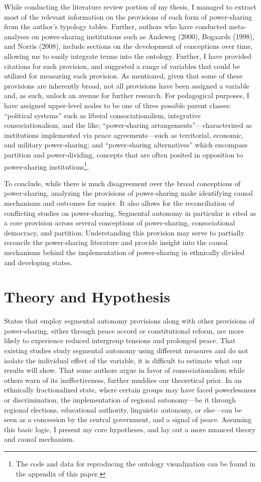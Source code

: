 \documentclass[12pt]{article}
\begin{document}
While conducting the literature review portion of my thesis, I managed to extract most of the relevant information on the provisions of each form of power-sharing from the author’s typology tables. Further, authors who have conducted meta-analyses on power-sharing institutions such as Andeweg (2000), Bogaards (1998), and Norris (2008), include sections on the development of conceptions over time, allowing me to easily integrate terms into the ontology. Further, I have provided citations for each provision, and suggested a range of variables that could be utilized for measuring each provision. As mentioned, given that some of these provisions are inherently broad, not all provisions have been assigned a variable and, as such, unlock an avenue for further research. For pedagogical purposes, I have assigned upper-level nodes to be one of three possible parent classes: ``political systems'' such as liberal consociationalism, integrative consociationalism, and the like; ``power-sharing arrangements''---characterized as institutions implemented via peace agreements---such as territorial, economic, and military power-sharing; and ``power-sharing alternatives'' which encompass partition and power-dividing, concepts that are often posited in opposition to power-sharing institutions\footnote{The code and data for reproducing the ontology visualization can be found in the appendix of this paper.}.

To conclude, while there is much disagreement over the broad conceptions of power-sharing, analyzing the provisions of power-sharing make identifying causal mechanisms and outcomes far easier. It also allows for the reconciliation of conflicting studies on power-sharing. Segmental autonomy in particular is cited as a core provision across several conceptions of power-sharing, consociational democracy, and partition. Understanding this provision may serve to partially reconcile the power-sharing literature and provide insight into the causal mechanisms behind the implementation of power-sharing in ethnically divided and developing states. 

\section{Theory and Hypothesis}
States that employ segmental autonomy provisions along with other provisions of power-sharing, either through peace accord or constitutional reform, are more likely to experience reduced intergroup tensions and prolonged peace. That existing studies study segmental autonomy using different measures and do not isolate the individual effect of the variable, it is difficult to estimate what our results will show. That some authors argue in favor of consociationalism while others warn of its ineffectiveness, further muddies our theoretical prior. In an ethnically fractionalized state, where certain groups may have faced powerlessness or discrimination, the implementation of regional autonomy---be it through regional elections, educational authority, linguistic autonomy, or else---can be seen as a concession by the central government, and a signal of peace. Assuming this basic logic, I present my core hypotheses, and lay out a more nuanced theory and causal mechanism. 
\end{document}
